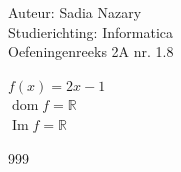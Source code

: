 \documentclass[a4paper]{article}
\begin{document}
  
\noindent \large Auteur: Sadia Nazary  \\
\noindent \large Studierichting: Informatica\\
\noindent \large Oefeningenreeks 2A nr. 1.8\\

\medskip

\normalsize

$f(x) = 2x - 1$\\

$\operatorname{dom}f = \mathbb{R}$\\

$\operatorname{Im}f = \mathbb{R}$\\

\begin{thebibliography}{999}
\end{thebibliography}
\end{document}
